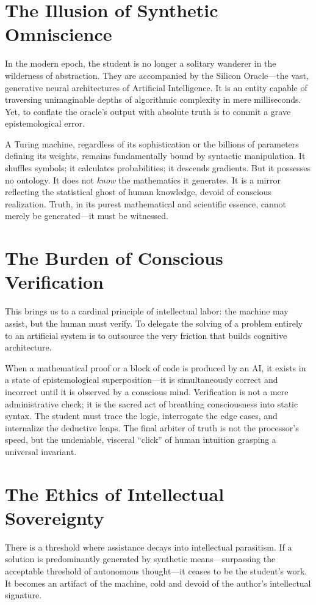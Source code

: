 \documentclass[11pt,a4paper,oneside]{book}
\theoremstyle{definition}
\theoremstyle{remark}
\begin{document}
\section{The Illusion of Synthetic Omniscience}
In the modern epoch, the student is no longer a solitary wanderer in the wilderness of abstraction. They are accompanied by the Silicon Oracle---the vast, generative neural architectures of Artificial Intelligence. It is an entity capable of traversing unimaginable depths of algorithmic complexity in mere milliseconds. Yet, to conflate the oracle's output with absolute truth is to commit a grave epistemological error.

A Turing machine, regardless of its sophistication or the billions of parameters defining its weights, remains fundamentally bound by syntactic manipulation. It shuffles symbols; it calculates probabilities; it descends gradients. But it possesses no ontology. It does not \textit{know} the mathematics it generates. It is a mirror reflecting the statistical ghost of human knowledge, devoid of conscious realization. Truth, in its purest mathematical and scientific essence, cannot merely be generated---it must be witnessed.

\section{The Burden of Conscious Verification}
This brings us to a cardinal principle of intellectual labor: the machine may assist, but the human must verify. To delegate the solving of a problem entirely to an artificial system is to outsource the very friction that builds cognitive architecture. 

When a mathematical proof or a block of code is produced by an AI, it exists in a state of epistemological superposition---it is simultaneously correct and incorrect until it is observed by a conscious mind. Verification is not a mere administrative check; it is the sacred act of breathing consciousness into static syntax. The student must trace the logic, interrogate the edge cases, and internalize the deductive leaps. The final arbiter of truth is not the processor's speed, but the undeniable, visceral ``click'' of human intuition grasping a universal invariant.

\section{The Ethics of Intellectual Sovereignty}
There is a threshold where assistance decays into intellectual parasitism. If a solution is predominantly generated by synthetic means---surpassing the acceptable threshold of autonomous thought---it ceases to be the student's work. It becomes an artifact of the machine, cold and devoid of the author's intellectual signature.
\end{document}

